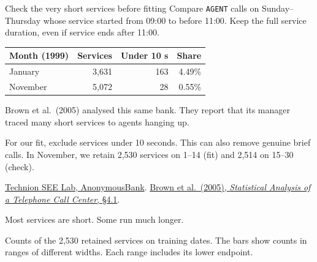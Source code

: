 \documentclass{beamer}
\begin{document}
\begin{frame}{Check the very short services before fitting}
  \small
  Compare \texttt{AGENT} calls on Sunday--Thursday whose service started
  from 09:00 to before 11:00. Keep the full service duration, even if
  service ends after 11:00.

  \vspace{0.55em}
  \begin{center}
    \begin{tabular}{@{}lrrr@{}}
      \toprule
      Month (1999) & Services & Under 10 s & Share\\
      \midrule
      January  & 3,631 & 163 & 4.49\%\\
      November & 5,072 &  28 & 0.55\%\\
      \bottomrule
    \end{tabular}
  \end{center}

  Brown et al.\ (2005) analysed this same bank. They report that its
  manager traced many short services to agents hanging up.

  \vspace{0.45em}
  For our fit, exclude services under 10 seconds. This can also remove
  genuine brief calls. In November, we retain 2,530 services on 1--14
  (fit) and 2,514 on 15--30 (check).

  \vspace{0.5em}
  {\scriptsize
    \href{https://seelab.net.technion.ac.il/data/}{Technion SEE Lab, AnonymousBank}.
    \href{https://faculty.wharton.upenn.edu/wp-content/uploads/2012/04/Brown-etal-CCdata.pdf}{Brown et al.\ (2005), \emph{Statistical Analysis of a Telephone Call Center}, \S4.1}.}
\end{frame}

\begin{frame}{Most services are short. Some run much longer.}
  \centering

  \vspace{0.55em}
  \raggedright\small
  Counts of the 2,530 retained services on training dates. The bars show
  counts in ranges of different widths. Each range includes its lower endpoint.
\end{frame}
\end{document}
